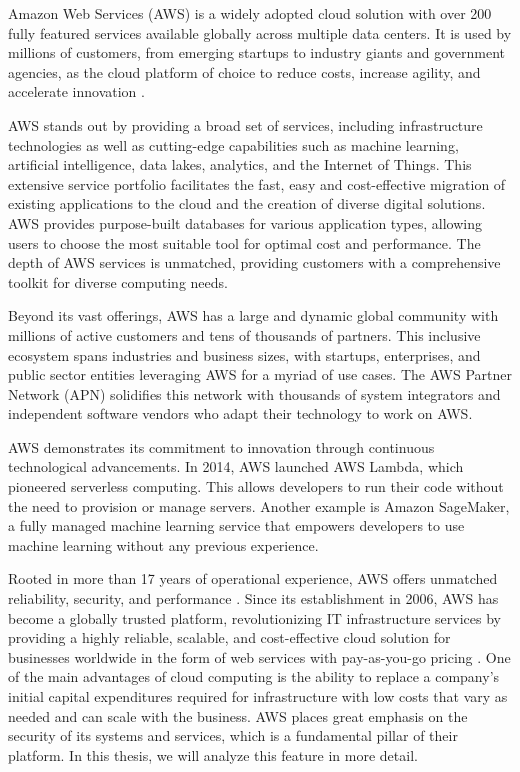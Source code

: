 Amazon Web Services (AWS) is a widely adopted cloud solution with over 200 fully featured services available globally across multiple data centers. It is used by millions of customers, from emerging startups to industry giants and government agencies, as the cloud platform of choice to reduce costs, increase agility, and accelerate innovation \cite{EuAmazonWebServices}.

AWS stands out by providing a broad set of services, including infrastructure technologies as well as cutting-edge capabilities such as machine learning, artificial intelligence, data lakes, analytics, and the Internet of Things. This extensive service portfolio facilitates the fast, easy and cost-effective migration of existing applications to the cloud and the creation of diverse digital solutions. AWS provides purpose-built databases for various application types, allowing users to choose the most suitable tool for optimal cost and performance. The depth of AWS services is unmatched, providing customers with a comprehensive toolkit for diverse computing needs.

Beyond its vast offerings, AWS has a large and dynamic global community with millions of active customers and tens of thousands of partners. This inclusive ecosystem spans industries and business sizes, with startups, enterprises, and public sector entities leveraging AWS for a myriad of use cases. The AWS Partner Network (APN) solidifies this network with thousands of system integrators and independent software vendors who adapt their technology to work on AWS.

AWS demonstrates its commitment to innovation through continuous technological advancements. In 2014, AWS launched AWS Lambda, which pioneered serverless computing. This allows developers to run their code without the need to provision or manage servers. Another example is Amazon SageMaker, a fully managed machine learning service that empowers developers to use machine learning without any previous experience.

Rooted in more than 17 years of operational experience, AWS offers unmatched reliability, security, and performance \cite{WhatIsAWS}. Since its establishment in 2006, AWS has become a globally trusted platform, revolutionizing IT infrastructure services by providing a highly reliable, scalable, and cost-effective cloud solution for businesses worldwide in the form of web services with pay-as-you-go pricing \cite{AboutAWS}. One of the main advantages of cloud computing is the ability to replace a company's initial capital expenditures required for infrastructure with low costs that vary as needed and can scale with the business. AWS places great emphasis on the security of its systems and services, which is a fundamental pillar of their platform. In this thesis, we will analyze this feature in more detail.

